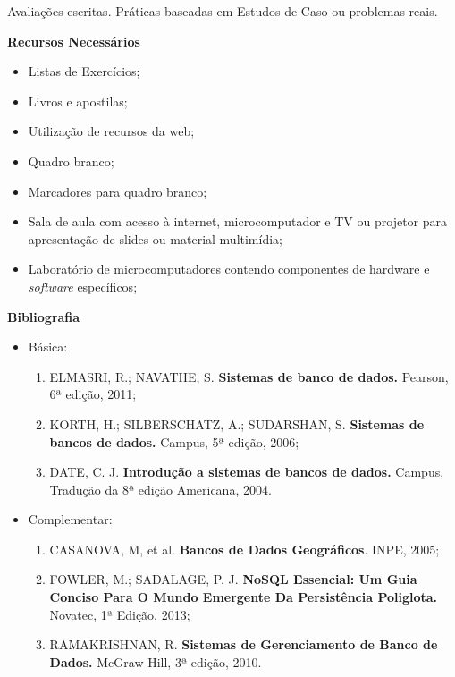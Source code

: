\noindent
  Avaliações escritas. Práticas baseadas em Estudos de Caso ou problemas reais.

\begin{snugshade}\begin{center}\textbf{
    Recursos Necessários
    \vphantom{q} %
}\end{center}\end{snugshade}

\begin{itemize} 
  \item Listas de Exercícios;
    \item Livros e apostilas;
    \item Utilização de recursos da web;
    \item Quadro branco;
    \item Marcadores para quadro branco;
    \item Sala de aula com acesso à internet, microcomputador e TV ou projetor para apresentação de slides ou material multimídia;
    \item Laboratório de microcomputadores contendo componentes de hardware e \textit{software} específicos;
\end{itemize}


\begin{snugshade}\begin{center}\textbf{
    Bibliografia
}\end{center}\end{snugshade}

\begin{itemize} 
  \item Básica:
	\begin{enumerate}
	\item 	ELMASRI, R.; NAVATHE, S. \textbf{Sistemas de banco de dados.} Pearson, 6ª edição, 2011;
	\item 	KORTH, H.; SILBERSCHATZ, A.; SUDARSHAN, S. \textbf{Sistemas de bancos de dados.} Campus, 5ª edição, 2006;
	\item 	DATE, C. J. \textbf{Introdução a sistemas de bancos de dados.} Campus, Tradução da 8ª edição Americana, 2004.
	\end{enumerate}
  \item Complementar:
	\begin{enumerate} 
	\item 	CASANOVA, M, et al. \textbf{Bancos de Dados Geográficos}. INPE, 2005; 
	\item 	FOWLER, M.; SADALAGE, P. J. \textbf{NoSQL Essencial: Um Guia Conciso Para O Mundo Emergente Da Persistência Poliglota.} Novatec, 1ª Edição, 2013;
	\item 	RAMAKRISHNAN, R. \textbf{Sistemas de Gerenciamento de Banco de Dados.} McGraw Hill, 3ª edição, 2010.
	\end{enumerate}
\end{itemize}
